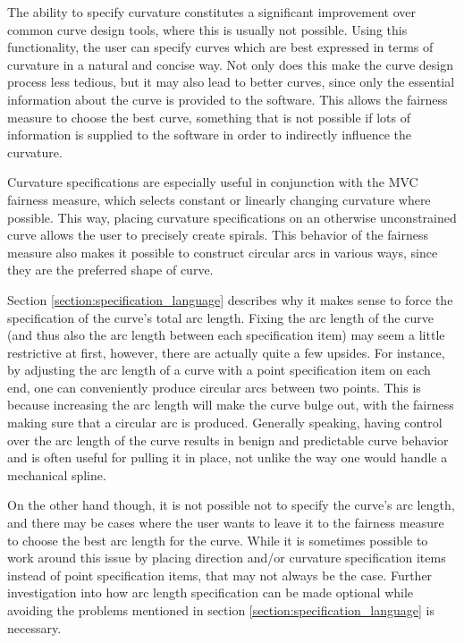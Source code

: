 \documentclass[a4paper]{article}
\begin{document}
				The ability to specify curvature constitutes a significant improvement over common curve design tools, where this is usually not possible. Using this functionality, the user can specify curves which are best expressed in terms of curvature in a natural and concise way. Not only does this make the curve design process less tedious, but it may also lead to better curves, since only the essential information about the curve is provided to the software. This allows the fairness measure to choose the best curve, something that is not possible if lots of information is supplied to the software in order to indirectly influence the curvature.

				Curvature specifications are especially useful in conjunction with the MVC fairness measure, which selects constant or linearly changing curvature where possible. This way, placing curvature specifications on an otherwise unconstrained curve allows the user to precisely create spirals. This behavior of the fairness measure also makes it possible to construct circular arcs in various ways, since they are the preferred shape of curve.

				Section \ref{section:specification_language} describes why it makes sense to force the specification of the curve's total arc length. Fixing the arc length of the curve (and thus also the arc length between each specification item) may seem a little restrictive at first, however, there are actually quite a few upsides. For instance, by adjusting the arc length of a curve with a point specification item on each end, one can conveniently produce circular arcs between two points. This is because increasing the arc length will make the curve bulge out, with the fairness making sure that a circular arc is produced. Generally speaking, having control over the arc length of the curve results in benign and predictable curve behavior and is often useful for pulling it in place, not unlike the way one would handle a mechanical spline.

				On the other hand though, it is not possible not to specify the curve's arc length, and there may be cases where the user wants to leave it to the fairness measure to choose the best arc length for the curve. While it is sometimes possible to work around this issue by placing direction and/or curvature specification items instead of point specification items, that may not always be the case. Further investigation into how arc length specification can be made optional while avoiding the problems mentioned in section \ref{section:specification_language} is necessary.
\end{document}
